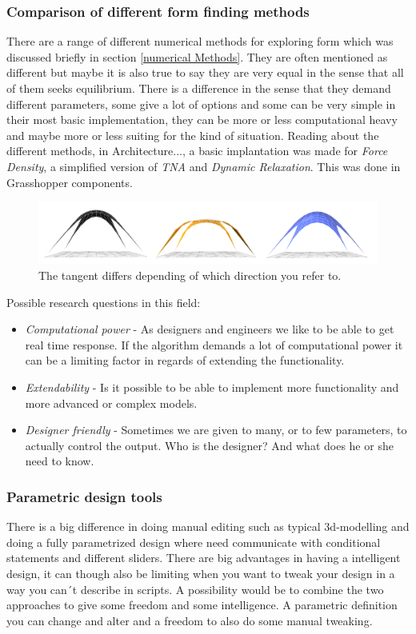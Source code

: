 \subsubsection{Comparison of different form finding methods} \label{CompMethods}
There are a range of different numerical methods for exploring form which was discussed briefly in section \ref{numerical Methods}. They are often mentioned as different but maybe it is also true to say they are very equal in the sense that all of them seeks equilibrium. There is a difference in the sense that they demand different parameters, some give a lot of options and some can be very simple in their most basic implementation, they can be more or less computational heavy and maybe more or less suiting for the kind of situation. 
Reading about the different methods, in Architecture..., a basic implantation was made for \textit{Force Density}, a simplified version of \textit{TNA} and \textit{Dynamic Relaxation}. This was done in Grasshopper components. 


\begin{figure}[H]
\centering
\includegraphics[width=0.9\linewidth ]{figure/Introduction/PreStudyComp.png}
\caption{The tangent differs depending of which direction you refer to. }
\end{figure}

Possible research questions in this field:
\begin{itemize}
\item \textit{Computational power} - As designers and engineers we like to be able to get real time response. If the algorithm demands a lot of computational power it can be a limiting factor in regards of extending the functionality. 
\item \textit{Extendability} - Is it possible to be able to implement more functionality and more advanced or complex models.
\item \textit{Designer friendly} - Sometimes we are given to many, or to few parameters, to actually control the output. Who is the designer? And what does he or she need to know. 
\end{itemize}

\subsubsection{Parametric design tools}
There is a big difference in doing manual editing such as typical 3d-modelling and doing a fully parametrized design where need communicate with conditional statements and different sliders. There are big advantages in having a intelligent design, it can though also be limiting when you want to tweak your design in a way you can´t describe in scripts. A possibility would be to combine the two approaches to give some freedom and some intelligence. A parametric definition you can change and alter and a freedom to also do some manual tweaking.\\


